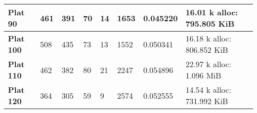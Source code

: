 \begin{table}[]
\begin{tabular}{|l|l|l|l|l|l|l|l|}
\textbf{Plat 90}                                    & 461                                                      & 391                                                        & 70                                                        & 14                                                                                                                                    & 1653                                                                                                                  & 0.045220                                                                                                           & 16.01 k alloc: 795.805 KiB                         \\ \hline
\textbf{Plat 100}                                   & 508                                                      & 435                                                        & 73                                                        & 13                                                                                                                                    & 1552                                                                                                                  & 0.050341                                                                                                           & 16.18 k alloc: 806.852 KiB                         \\ \hline
\textbf{Plat 110}                                   & 462                                                      & 382                                                        & 80                                                        & 21                                                                                                                                    & 2247                                                                                                                  & 0.054896                                                                                                           & 22.97 k alloc: 1.096 MiB                           \\ \hline
\textbf{Plat 120}                                   & 364                                                      & 305                                                        & 59                                                        & 9                                                                                                                                     & 2574                                                                                                                  & 0.052555                                                                                                           & 14.54 k alloc: 731.992 KiB                         \\ \hline

\end{tabular}
\end{table}
